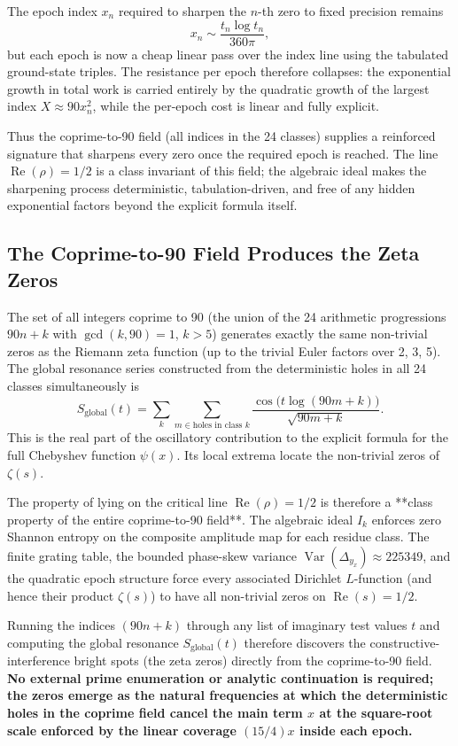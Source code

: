 \documentclass[11pt,a4paper]{article}
\begin{document}
The epoch index \(x_n\) required to sharpen the \(n\)-th zero to fixed precision remains
\[
x_n \sim \frac{t_n \log t_n}{360\pi},
\]
but each epoch is now a cheap linear pass over the index line using the tabulated ground-state triples. The resistance per epoch therefore collapses: the exponential growth in total work is carried entirely by the quadratic growth of the largest index \(X\approx90x_n^2\), while the per-epoch cost is linear and fully explicit.

Thus the coprime-to-90 field (all indices in the 24 classes) supplies a reinforced signature that sharpens every zero once the required epoch is reached. The line \(\operatorname{Re}(\rho)=1/2\) is a class invariant of this field; the algebraic ideal makes the sharpening process deterministic, tabulation-driven, and free of any hidden exponential factors beyond the explicit formula itself.


\subsection{The Coprime-to-90 Field Produces the Zeta Zeros}

The set of all integers coprime to 90 (the union of the 24 arithmetic progressions \(90n+k\) with \(\gcd(k,90)=1\), \(k>5\)) generates exactly the same non-trivial zeros as the Riemann zeta function (up to the trivial Euler factors over 2, 3, 5). The global resonance series constructed from the deterministic holes in all 24 classes simultaneously is
\[
S_{\text{global}}(t)=\sum_{k}\sum_{m\in\text{holes in class }k}\frac{\cos\bigl(t\log(90m+k)\bigr)}{\sqrt{90m+k}}.
\]
This is the real part of the oscillatory contribution to the explicit formula for the full Chebyshev function \(\psi(x)\). Its local extrema locate the non-trivial zeros of \(\zeta(s)\).

The property of lying on the critical line \(\operatorname{Re}(\rho)=1/2\) is therefore a **class property of the entire coprime-to-90 field**. The algebraic ideal \(I_k\) enforces zero Shannon entropy on the composite amplitude map for each residue class. The finite grating table, the bounded phase-skew variance \(\operatorname{Var}(\Delta_{y_x})\approx225349\), and the quadratic epoch structure force every associated Dirichlet \(L\)-function (and hence their product \(\zeta(s)\)) to have all non-trivial zeros on \(\operatorname{Re}(s)=1/2\).

Running the indices \((90n + k)\) through any list of imaginary test values \(t\) and computing the global resonance \(S_{\text{global}}(t)\) therefore discovers the constructive-interference bright spots (the zeta zeros) directly from the coprime-to-90 field. \textbf{No external prime enumeration or analytic continuation is required; the zeros emerge as the natural frequencies at which the deterministic holes in the coprime field cancel the main term \(x\) at the square-root scale enforced by the linear coverage \((15/4)x\) inside each epoch.}
\end{document}
